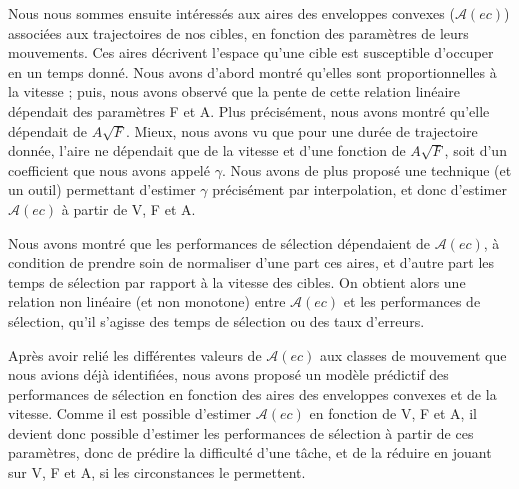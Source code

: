 	Nous nous sommes ensuite intéressés aux aires des enveloppes convexes ($\mathcal{A}(ec)$) associées aux trajectoires de nos cibles, en fonction des paramètres de leurs mouvements. Ces aires décrivent l'espace qu'une cible est susceptible d'occuper en un temps donné. Nous avons d'abord montré qu'elles sont proportionnelles à la vitesse ; puis, nous avons observé que la pente de cette relation linéaire dépendait des paramètres F et A. Plus précisément, nous avons montré qu'elle dépendait de $A\sqrt{F}$. Mieux, nous avons vu que pour une durée de trajectoire donnée, l'aire ne dépendait que de la vitesse et d'une fonction de $A\sqrt{F}$, soit d'un coefficient que nous avons appelé $\gamma$. Nous avons de plus proposé une technique (et un outil) permettant d'estimer $\gamma$ précisément par interpolation, et donc d'estimer $\mathcal{A}(ec)$ à partir de V, F et A.
	
	Nous avons montré que les performances de sélection dépendaient de $\mathcal{A}(ec)$, à condition de prendre soin de normaliser d'une part ces aires, et d'autre part les temps de sélection par rapport à la vitesse des cibles. On obtient alors une relation non linéaire (et non monotone) entre $\mathcal{A}(ec)$ et les performances de sélection, qu'il s'agisse des temps de sélection ou des taux d'erreurs.
	
	Après avoir relié les différentes valeurs de $\mathcal{A}(ec)$ aux classes de mouvement que nous avions déjà identifiées, nous avons proposé un modèle prédictif des performances de sélection en fonction des aires des enveloppes convexes et de la vitesse. Comme il est possible d'estimer $\mathcal{A}(ec)$ en fonction de V, F et A, il devient donc possible d'estimer les performances de sélection à partir de ces paramètres, donc de prédire la difficulté d'une tâche, et de la réduire en jouant sur V, F et A, si les circonstances le permettent.

\clearpage
